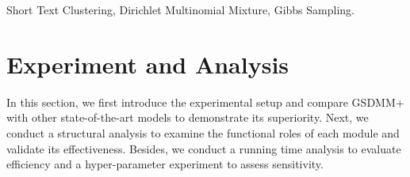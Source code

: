 \documentclass[lettersize,journal]{IEEEtran}
\newcommand{\sysname}{GSDMM+}
\begin{document}
\begin{IEEEkeywords}
Short Text Clustering, Dirichlet Multinomial Mixture, Gibbs Sampling.
\end{IEEEkeywords}








\section{Experiment and Analysis} \label{sec:Exp}
In this section, we first introduce the experimental setup and compare \sysname{} with other state-of-the-art models to demonstrate its superiority. Next, we conduct a structural analysis to examine the functional roles of each module and validate its effectiveness. Besides, we conduct a running time analysis to evaluate efficiency and a hyper-parameter experiment to assess sensitivity.

 






\end{document}
